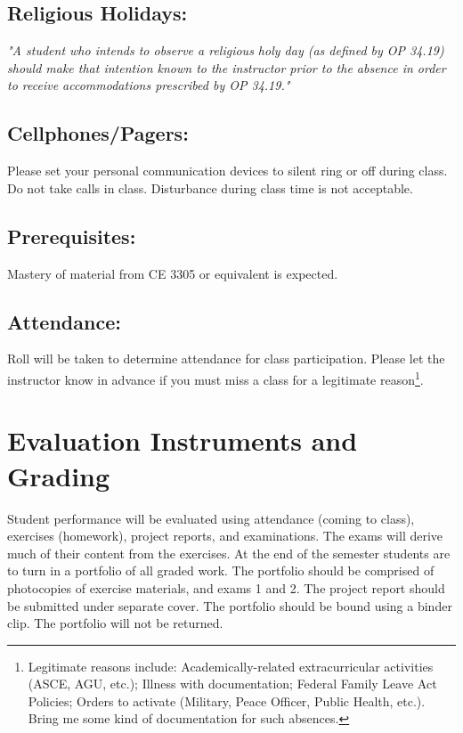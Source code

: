 \documentclass[12pt]{article}
\begin{document}
\subsection*{Religious Holidays:}
\textsl{ "A student who intends to observe a religious holy day (as defined by OP 34.19) should
make that intention known to the instructor prior to the absence in order to receive accommodations
prescribed by OP 34.19."}

\subsection*{Cellphones/Pagers: }
Please set your personal communication devices to silent ring or off during class. 
Do not take calls in class. Disturbance during class time is not acceptable.

\subsection*{Prerequisites:} 
Mastery of material from CE 3305 or equivalent is expected.

\subsection*{Attendance:} Roll will be taken to determine attendance for class participation.  Please let the instructor know in advance if you must miss a class for a legitimate reason\footnote{Legitimate reasons include: Academically-related extracurricular activities (ASCE, AGU, etc.); Illness with documentation; Federal Family Leave Act Policies; Orders to activate (Military, Peace Officer, Public Health, etc.).  Bring me some kind of documentation for such absences.}. 

\section*{Evaluation Instruments and Grading}
Student performance will be evaluated using attendance (coming to class), exercises (homework), project reports, and examinations.   The exams will derive much of their content from the exercises.  At the end of the semester students are to turn in a portfolio of all graded work.  The portfolio should be comprised of photocopies of exercise materials, and exams 1 and 2.  The project report should be submitted under separate cover.  The portfolio should be bound using a binder clip.  The portfolio will not be returned.  

\end{document}
